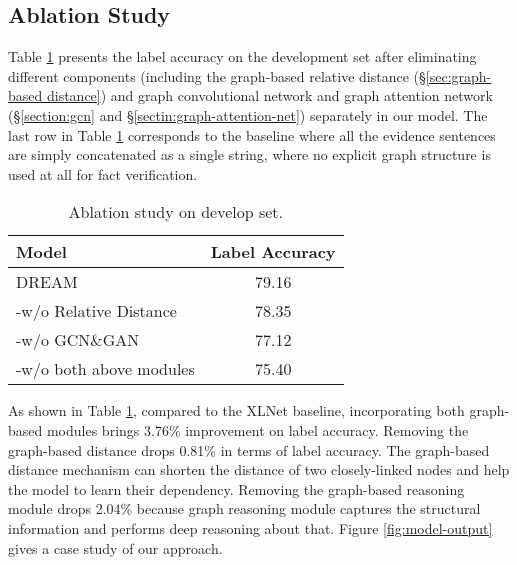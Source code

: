 \documentclass[11pt,a4paper]{article}
\begin{document}
\subsection{Ablation Study}
Table \ref{tab:ablation-study} presents the label accuracy on the development set after eliminating different components (including the graph-based relative distance (\S \ref{sec:graph-based distance}) and graph convolutional network and graph attention network (\S \ref{section:gcn} and \S \ref{sectin:graph-attention-net}) separately in our model.
The last row in Table \ref{tab:ablation-study} corresponds to the baseline where all the evidence sentences are simply concatenated as a single string, where no explicit graph structure is used at all for fact verification.
\begin{table}[h]
	\centering
	\begin{tabular}{l|c}
		\hline
		Model                  & Label Accuracy \\ \hline
		DREAM               & 79.16      \\
		-w/o Relative Distance & 78.35       \\
		-w/o GCN\&GAN   & 77.12      \\ 
		-w/o both above modules & 75.40 \\\hline
	\end{tabular}
	\caption{Ablation study on develop set.}
	\label{tab:ablation-study}
\end{table}

As shown in Table \ref{tab:ablation-study}, compared to the XLNet baseline, incorporating both graph-based modules brings 3.76\% improvement on label accuracy.
Removing the graph-based distance drops 0.81\% in terms of label accuracy.
The graph-based distance mechanism can shorten the distance of two closely-linked nodes and help the model to learn their dependency.
Removing the graph-based reasoning module drops 2.04\% because graph reasoning module captures the structural information and \mbox{performs} deep reasoning about that.
Figure \ref{fig:model-output} gives a case study of our approach.
\end{document}
